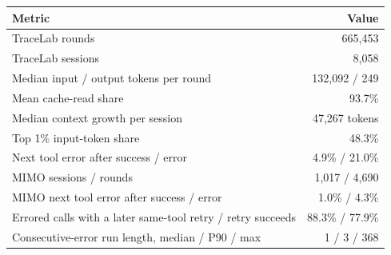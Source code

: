 \begin{tabular}{lr}
\toprule
Metric & Value \\
\midrule
TraceLab rounds & 665,453 \\
TraceLab sessions & 8,058 \\
Median input / output tokens per round & 132,092 / 249 \\
Mean cache-read share & 93.7\% \\
Median context growth per session & 47,267 tokens \\
Top 1\% input-token share & 48.3\% \\
Next tool error after success / error & 4.9\% / 21.0\% \\
MIMO sessions / rounds & 1,017 / 4,690 \\
MIMO next tool error after success / error & 1.0\% / 4.3\% \\
Errored calls with a later same-tool retry / retry succeeds & 88.3\% / 77.9\% \\
Consecutive-error run length, median / P90 / max & 1 / 3 / 368 \\
\bottomrule
\end{tabular}
